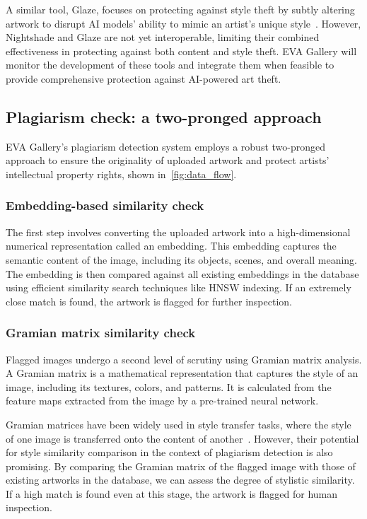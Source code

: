 A similar tool, Glaze, focuses on protecting against style theft by subtly altering artwork to disrupt AI models' ability to mimic an artist's unique style~\cite{shan2023glaze}. However, Nightshade and Glaze are not yet interoperable, limiting their combined effectiveness in protecting against both content and style theft. EVA Gallery will monitor the development of these tools and integrate them when feasible to provide comprehensive protection against AI-powered art theft.

\subsection{Plagiarism check: a two-pronged approach}

EVA Gallery's plagiarism detection system employs a robust two-pronged approach to ensure the originality of uploaded artwork and protect artists' intellectual property rights, shown in~\autoref{fig:data_flow}.

\subsubsection{Embedding-based similarity check}

The first step involves converting the uploaded artwork into a high-dimensional numerical representation called an embedding. This embedding captures the semantic content of the image, including its objects, scenes, and overall meaning. The embedding is then compared against all existing embeddings in the database using efficient similarity search techniques like HNSW indexing. If an extremely close match is found, the artwork is flagged for further inspection.

\subsubsection{Gramian matrix similarity check}

Flagged images undergo a second level of scrutiny using Gramian matrix analysis. A Gramian matrix is a mathematical representation that captures the style of an image, including its textures, colors, and patterns. It is calculated from the feature maps extracted from the image by a pre-trained neural network.

Gramian matrices have been widely used in style transfer tasks, where the style of one image is transferred onto the content of another~\cite{nicolas2019improving}. However, their potential for style similarity comparison in the context of plagiarism detection is also promising. By comparing the Gramian matrix of the flagged image with those of existing artworks in the database, we can assess the degree of stylistic similarity. If a high match is found even at this stage, the artwork is flagged for human inspection.

